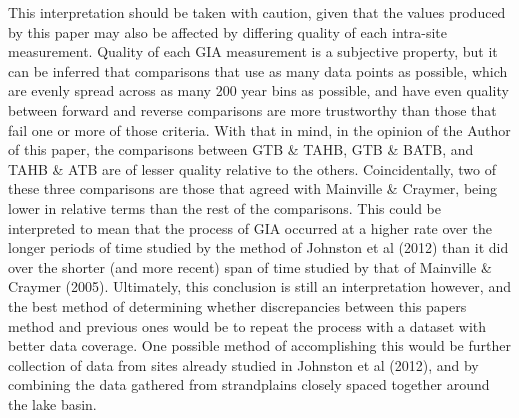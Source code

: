 This interpretation should be taken with caution, given that the values produced
by this paper
may also be affected by differing quality of each intra-site measurement. Quality
of each GIA measurement is a subjective property, but it can be inferred that comparisons
that use as many data points as possible, which are evenly spread across as many 
200 year bins as possible, and have even quality between forward 
and reverse comparisons are more trustworthy than those that fail one or more of
those criteria. With that in mind, in the opinion of the Author of this paper,
the comparisons between GTB \& TAHB, GTB \& BATB, and TAHB \& ATB are of lesser
quality relative to the others. Coincidentally, two of these three comparisons
are those that agreed with Mainville \& Craymer, being lower in relative terms than
the rest of the comparisons. This could be interpreted to mean that the process of
GIA occurred at a higher rate over the longer periods of time studied by the
method of Johnston et al (2012) than it did over the shorter (and more recent)
span of time studied by that of Mainville \& Craymer (2005). Ultimately, this
conclusion is still an interpretation however, and the best method of determining
whether discrepancies between this papers method and previous ones would be to 
repeat the process with a dataset with better data coverage. One possible method
of accomplishing this would be further collection of data from sites already studied
in Johnston et al (2012), and by combining the data gathered from strandplains
closely spaced together around the lake basin.
